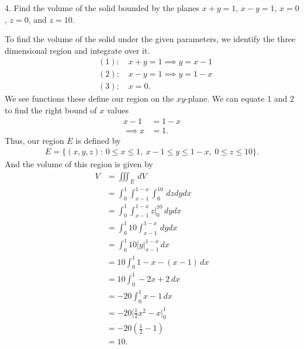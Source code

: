 \documentclass{report}
\begin{document}
    \bigbreak \noindent 
    \begin{mdframed}
        4. Find the volume of the solid bounded by the planes $x + y = 1$, $x - y = 1$, $x = 0$, $z = 0$, and $z = 10$.
    \end{mdframed}
    \bigbreak \noindent 
    To find the volume of the solid under the given parameters, we identify the three dimensional region  and integrate over it.
    \begin{align*}
        &(1): \quad x+y =1 \implies y = x-1 \\
        &(2): \quad x-y = 1 \implies y = 1-x \\
        &(3): \quad x = 0 
    .\end{align*}
    \bigbreak \noindent 
    We see functions these define our region on the $xy$-plane. We can equate 1 and 2 to find the right bound of $x$ values
    \begin{align*}
        x -1  &= 1- x \\
              \implies x &= 1
    .\end{align*}
    \bigbreak \noindent 
    Thus, our region $E$ is defined by
    \begin{align*}
        E = \{(x,y,z):\ 0 \leq x \leq 1,\ x-1 \leq y \leq 1-x,\ 0 \leq z \leq 10\}
    .\end{align*}
    And the volume of this region is given by
    \begin{align*}
        V &= \iiint_{E}\, dV \\
          &=\int_{0}^{1}\int_{x-1}^{1-x}\int_{0}^{10}  \, dzdydx \\
          &=\int_{0}^{1}\int_{x-1}^{1-x} z\bigg|^{10}_{0} \, dydx \\
          &=\int_{0}^{1}10\int_{x-1}^{1-x}\, dydx \\
          &=\int_{0}^{1} 10\bigg[y\bigg|_{x-1}^{1-x} \, dx \\
          &=10\int_{0}^{1} 1-x -(x-1) \, dx \\
          &=10\int_{0}^{1} -2x +2 \, dx \\
          &=-20\int_{0}^{1} x -1 \, dx \\
          &=-20\bigg[\frac{1}{2}x^{2}-x\bigg|_{0}^{1} \\
          &=-20\left(\frac{1}{2}-1\right) \\
          &=10
    .\end{align*}
\end{document}
